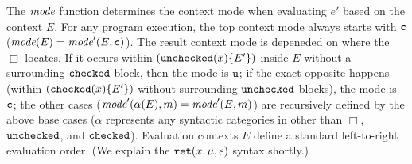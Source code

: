 The $\textit{mode}$ function
determines the context mode when evaluating $e'$ based on the context $E$.
For any program execution, the top context mode always starts with $\texttt{c}$ ($\textit{mode}(E)=\textit{mode}'(E,\texttt{c})$).
The result context mode is depeneded on where the $\Box$ locates.
If it occurs within $(\mathtt{unchecked}({\overline{x}})\{E'\})$ inside $E$ without
a surrounding $\mathtt{checked}$ block, then the mode is
$\texttt{u}$; if the exact opposite happens (within $(\mathtt{checked}({\overline{x}}){\{E'\}})$ without surrounding $\mathtt{unchecked}$ blocks),
the mode is $\texttt{c}$; the other cases ($\textit{mode}'(\alpha({E}),m)=\textit{mode}'(E,m)$) are recursively defined by the above base cases ($\alpha$ represents any syntactic categories in  other than $\Box$, $\mathtt{unchecked}$, and $\mathtt{checked}$).
Evaluation contexts $E$ define a standard left-to-right evaluation order. (We explain the
$\mathtt{ret}({x},{\mu},{e})$ syntax shortly.)


